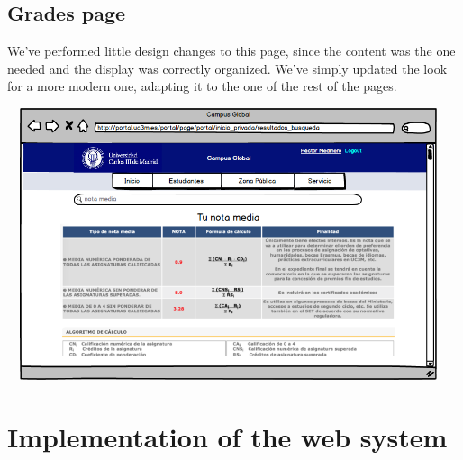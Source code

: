 \documentclass{article}
\begin{document}
\subsection{Grades page}
We’ve performed little design changes to this page, since the content was the one needed and the display was correctly organized. We’ve simply updated the look for a more modern one, adapting it to the one of the rest of the pages.

\begin{center}
\includegraphics[width=13cm, height=8cm, keepaspectratio]{mockup_notamedia}
\end{center}

\section{Implementation of the web system}
\end{document}
